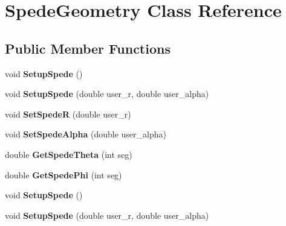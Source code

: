 \hypertarget{class_spede_geometry}{}\section{Spede\+Geometry Class Reference}
\label{class_spede_geometry}
\subsection*{Public Member Functions}
\begin{DoxyCompactItemize}
\item 
\mbox{\label{class_spede_geometry_aff2cf68512c9a78eb117ff1ea44e95f0}} 
void {\bfseries Setup\+Spede} ()
\item 
\mbox{\label{class_spede_geometry_ae79185d5c0e1d21a1a26ef824038ce9c}} 
void {\bfseries Setup\+Spede} (double user\+\_\+r, double user\+\_\+alpha)
\item 
\mbox{\label{class_spede_geometry_ad17f4485ee83860a40082d8c8af5237c}} 
void {\bfseries Set\+SpedeR} (double user\+\_\+r)
\item 
\mbox{\label{class_spede_geometry_a94c3f5b2dbf4490db7d72514c8abe340}} 
void {\bfseries Set\+Spede\+Alpha} (double user\+\_\+alpha)
\item 
\mbox{\label{class_spede_geometry_a05865b0752fb518337a9a16f8fba9085}} 
double {\bfseries Get\+Spede\+Theta} (int seg)
\item 
\mbox{\label{class_spede_geometry_a93bd92636bce1259b189bb17275d238d}} 
double {\bfseries Get\+Spede\+Phi} (int seg)
\item 
\mbox{\label{class_spede_geometry_aff2cf68512c9a78eb117ff1ea44e95f0}} 
void {\bfseries Setup\+Spede} ()
\item 
\mbox{\label{class_spede_geometry_ae79185d5c0e1d21a1a26ef824038ce9c}} 
void {\bfseries Setup\+Spede} (double user\+\_\+r, double user\+\_\+alpha)
\item 
\mbox{\label{class_spede_geometry_ad17f4485ee83860a40082d8c8af5237c}} 

\end{DoxyCompactItemize}
